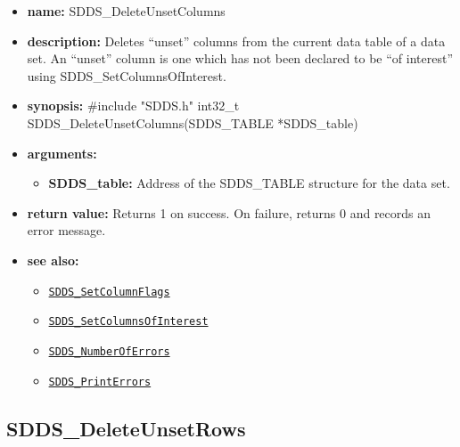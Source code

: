 \documentclass[11pt]{article}
\newcommand{\progref}[1]{\hyperref[SDDS_#1]{\tt SDDS\_#1}}
\begin{document}
\begin{itemize}
\item {\bf name:}\newline
SDDS\_DeleteUnsetColumns
\item {\bf description:}\newline
Deletes ``unset'' columns from the current data table of a data set. An ``unset'' column is one which has not been declared to be ``of interest'' using SDDS\_SetColumnsOfInterest.
\item {\bf synopsis:} \#include "SDDS.h"\newline
int32\_t SDDS\_DeleteUnsetColumns(SDDS\_TABLE *SDDS\_table)
\item {\bf arguments:}
\begin{itemize}
\item {\bf SDDS\_table:} Address of the SDDS\_TABLE structure for the data set.
\end{itemize}
\item {\bf return value:}\newline
Returns 1 on success. On failure, returns 0 and records an error message.
\item {\bf see also:}
\begin{itemize}
\item \progref{SetColumnFlags}
\item \progref{SetColumnsOfInterest}
\item \progref{NumberOfErrors}
\item \progref{PrintErrors}
\end{itemize}
\end{itemize}

\subsection{SDDS\_DeleteUnsetRows}
\label{SDDS_DeleteUnsetRows}
\end{document}
